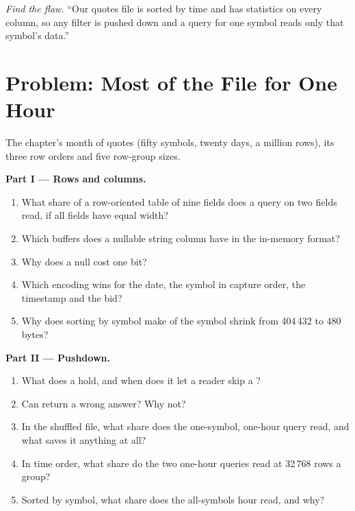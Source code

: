 \begin{exercise}[$\star\star\star$]\label{exo:pl:columnar-formats:8}
\emph{Find the flaw.} ``Our quotes file is sorted by time and has statistics on every column, so any filter is pushed down and a
query for one symbol reads only that symbol's data.''
\end{exercise}

\section{Problem: Most of the File for One Hour}

\begin{problem}\label{pb:pl:columnar-formats:1}
The chapter's month of quotes (fifty symbols, twenty days, a million rows), its three row orders and five row-group sizes.

\medskip\noindent\textbf{Part I --- Rows and columns.}
\begin{enumerate}
\item What share of a row-oriented table of nine fields does a query on two fields read, if all fields have equal width?
\item Which buffers does a nullable string column have in the in-memory format?
\item Why does a null cost one bit?
\item Which encoding wins for the date, the symbol in capture order, the timestamp and the bid?
\item Why does sorting by symbol make  of the symbol shrink from 404\,432 to 480 bytes?
\end{enumerate}

\medskip\noindent\textbf{Part II --- Pushdown.}
\begin{enumerate}[resume]
\item What does a  hold, and when does it let a reader skip a ?
\item Can  return a wrong answer? Why not?
\item In the shuffled file, what share does the one-symbol, one-hour query read, and what saves it anything at all?
\item In time order, what share do the two one-hour queries read at 32\,768 rows a group?
\item Sorted by symbol, what share does the all-symbols hour read, and why?
\end{enumerate}


\end{problem}
